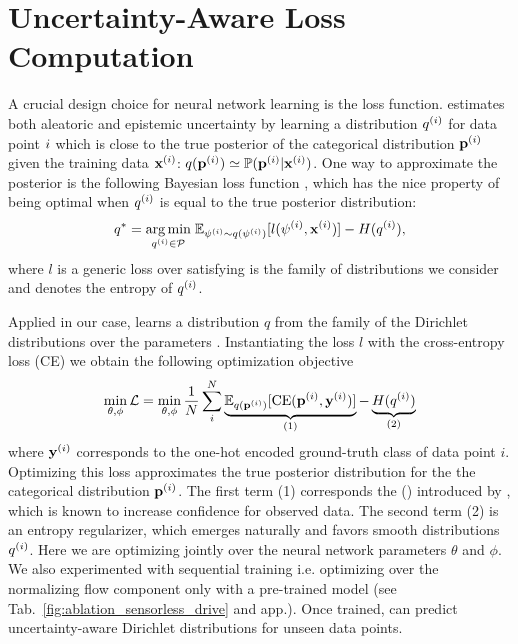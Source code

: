 \section{Uncertainty-Aware Loss Computation}
\label{sec:uncertainty_loss_006}

A crucial design choice for neural network learning is the loss function. \PostNetacro estimates both aleatoric and epistemic uncertainty by learning a distribution $q^{(i)}$ for data point $i$ which is close to the true posterior of the categorical distribution $\mathbf{p}^{(i)}$ given the training data $\mathbf{x}^{(i)}$:
    $q(\mathbf{p}^{(i)}) \simeq \mathbb{P}(\mathbf{p}^{(i)} | \mathbf{x}^{(i)})$.
One way to approximate the posterior is the following Bayesian loss function \cite{update-belief-propagation,PAC-bayesian_estimator,opt_info_processing_bayes}, which has the nice property of being optimal when $q^{(i)}$ is equal to the true posterior distribution:
\begin{equation}
\label{general_bayesian_loss}
    q^* = \underset{q^{(i)} \in \mathcal{P}}{\arg \min}\; \mathbb{E}_{\psi^{(i)} \sim q(\psi^{(i)})}[l(\psi^{(i)}, \mathbf{x}^{(i)})] - H(q^{(i)}),
\end{equation}
where $l$ is a generic loss over \smash{$\psi\dataix$} satisfying  is the family of distributions we consider and  denotes the entropy of $q^{(i)}$.

Applied in our case, \PostNet learns a distribution $q$ from the family of the Dirichlet distributions  over the parameters . Instantiating the loss $l$ with the cross-entropy loss (CE) we obtain the following optimization objective
\begin{equation}
\label{dirichlet_bayesian_loss}
       \min_{\theta,\phi} \mathcal{L} = \min_{\theta, \phi} \frac{1}{N} \sum_{i}^{N} \underbrace{\mathbb{E}_{q(\mathbf{p}^{(i)})}[\text{CE}(\mathbf{p}^{(i)}, \mathbf{y}^{(i)})]}_{\text{(1)}} - \underbrace{H(q^{(i)})}_{\text{(2)}}
\end{equation}
where $\mathbf{y}^{(i)}$ corresponds to the one-hot encoded ground-truth class of data point $i$.
Optimizing this loss approximates the true posterior distribution for the the categorical distribution $\mathbf{p}^{(i)}$. The first term (1) corresponds the \UCE (\UCEacro) introduced by \cite{uceloss}, which is known to increase confidence for observed data. The second term (2) is an entropy regularizer, which emerges naturally and favors smooth distributions $q^{(i)}$. Here we are optimizing jointly over the neural network parameters $\theta$ and $\phi$. We also experimented with sequential training i.e. optimizing over the normalizing flow component only with a pre-trained model (see Tab.~\ref{fig:ablation_sensorless_drive} and app.). Once trained, \PostNetacro can predict uncertainty-aware Dirichlet distributions for unseen data points.

